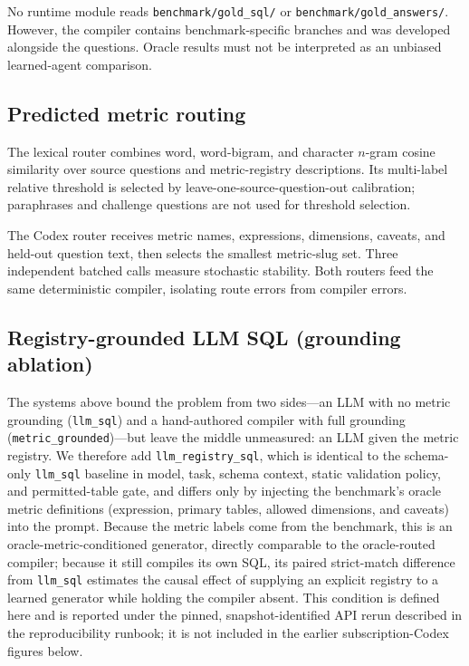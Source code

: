 \documentclass[11pt]{article}
\begin{document}
No runtime module reads \texttt{benchmark/gold\_sql/} or
\texttt{benchmark/gold\_answers/}. However, the compiler contains
benchmark-specific branches and was developed alongside the questions. Oracle
results must not be interpreted as an unbiased learned-agent comparison.

\subsection{Predicted metric routing}
The lexical router combines word, word-bigram, and character $n$-gram cosine
similarity over source questions and metric-registry descriptions. Its
multi-label relative threshold is selected by leave-one-source-question-out
calibration; paraphrases and challenge questions are not used for threshold
selection.

The Codex router receives metric names, expressions, dimensions, caveats, and
held-out question text, then selects the smallest metric-slug set. Three
independent batched calls measure stochastic stability. Both routers feed the
same deterministic compiler, isolating route errors from compiler errors.

\subsection{Registry-grounded LLM SQL (grounding ablation)}
The systems above bound the problem from two sides---an LLM with no metric
grounding (\texttt{llm\_sql}) and a hand-authored compiler with full grounding
(\texttt{metric\_grounded})---but leave the middle unmeasured: an LLM given the
metric registry. We therefore add \texttt{llm\_registry\_sql}, which is identical
to the schema-only \texttt{llm\_sql} baseline in model, task, schema context,
static validation policy, and permitted-table gate, and differs only by injecting
the benchmark's oracle metric definitions (expression, primary tables, allowed
dimensions, and caveats) into the prompt. Because the metric labels come from the
benchmark, this is an oracle-metric-conditioned generator, directly comparable to
the oracle-routed compiler; because it still compiles its own SQL, its paired
strict-match difference from \texttt{llm\_sql} estimates the causal effect of
supplying an explicit registry to a learned generator while holding the compiler
absent. This condition is defined here and is reported under the pinned,
snapshot-identified API rerun described in the reproducibility runbook; it is not
included in the earlier subscription-Codex figures below.
\end{document}
